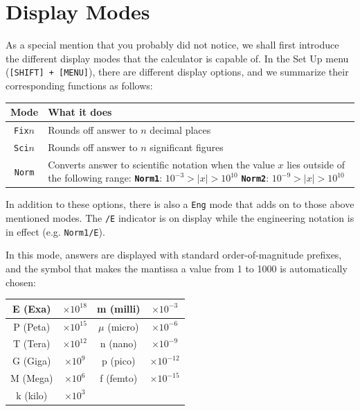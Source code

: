 \documentclass[a5paper,draft]{memoir}
\def\code#1{\texttt{#1}}
\begin{document}
\section{Display Modes}
As a special mention that you probably did not notice, we shall first introduce the different display modes that the calculator is capable of. In the Set Up menu (\code{[SHIFT] + [MENU]}), there are different display options, and we summarize their corresponding functions as follows:
\begin{center}
	\renewcommand{\arraystretch}{1.3}
	\begin{tabular}{|c|p{7.5cm}|}
		\hline
		\textbf{Mode}	&	\textbf{What it does} \\
		\hline
		\code{Fix}$n$	&	Rounds off answer to $n$ decimal places \\
		\hline
		\code{Sci}$n$	&	Rounds off answer to $n$ significant figures \\
		\hline
		\code{Norm}		&	Converts answer to scientific notation when the value $x$ lies outside of the following range: \vspace{2mm} \newline \hspace*{5mm} \textbf{\code{Norm1}}: $10^{-3}>|x|>10^{10}$ \newline \hspace*{5mm} \textbf{\code{Norm2}}: $10^{-9}>|x|>10^{10}$ \\
		\hline
	\end{tabular}
\end{center}

In addition to these options, there is also a \code{Eng} mode that adds on to those above mentioned modes. The \code{/E} indicator is on display while the engineering notation is in effect (e.g. \code{Norm1/E}). 

In this mode, answers are displayed with standard order-of-magnitude prefixes, and the symbol that makes the mantissa a value from 1 to 1000 is automatically chosen:
\begin{center}
	\renewcommand{\arraystretch}{1.3}
	\begin{tabular}{|c|c||c|c|}
		\hline
		E (Exa)		& $\times10^{18}$	& m (milli)	& $\times10^{-3}$ \\
		\hline
		P (Peta)	& $\times10^{15}$	& $\mu$ (micro)	& $\times10^{-6}$ \\
		\hline
		T (Tera)	& $\times10^{12}$	& n (nano)	& $\times10^{-9}$ \\
		\hline
		G (Giga)	& $\times10^{9}$	& p (pico)	& $\times10^{-12}$ \\
		\hline
		M (Mega)	& $\times10^{6}$	& f (femto)	& $\times10^{-15}$ \\
		\hline
		k (kilo)	& $\times10^3$		& 	&  \\
		\hline
	\end{tabular}
\end{center}
\end{document}
